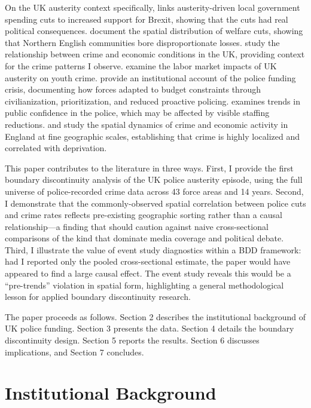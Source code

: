 \documentclass[12pt]{article}
\begin{document}
On the UK austerity context specifically, \citet{fetzer2019} links austerity-driven local government spending cuts to increased support for Brexit, showing that the cuts had real political consequences. \citet{beatty2013} document the spatial distribution of welfare cuts, showing that Northern English communities bore disproportionate losses. \citet{machin2011} study the relationship between crime and economic conditions in the UK, providing context for the crime patterns I observe. \citet{bell2014} examine the labor market impacts of UK austerity on youth crime. \citet{hm_inspectorate2017} provide an institutional account of the police funding crisis, documenting how forces adapted to budget constraints through civilianization, prioritization, and reduced proactive policing. \citet{bradford2011} examines trends in public confidence in the police, which may be affected by visible staffing reductions. \citet{disney2019} and \citet{haining2014} study the spatial dynamics of crime and economic activity in England at fine geographic scales, establishing that crime is highly localized and correlated with deprivation.

This paper contributes to the literature in three ways. First, I provide the first boundary discontinuity analysis of the UK police austerity episode, using the full universe of police-recorded crime data across 43 force areas and 14 years. Second, I demonstrate that the commonly-observed spatial correlation between police cuts and crime rates reflects pre-existing geographic sorting rather than a causal relationship---a finding that should caution against naive cross-sectional comparisons of the kind that dominate media coverage and political debate. Third, I illustrate the value of event study diagnostics within a BDD framework: had I reported only the pooled cross-sectional estimate, the paper would have appeared to find a large causal effect. The event study reveals this would be a ``pre-trends'' violation in spatial form, highlighting a general methodological lesson for applied boundary discontinuity research.

The paper proceeds as follows. Section 2 describes the institutional background of UK police funding. Section 3 presents the data. Section 4 details the boundary discontinuity design. Section 5 reports the results. Section 6 discusses implications, and Section 7 concludes.


\section{Institutional Background}
\end{document}

